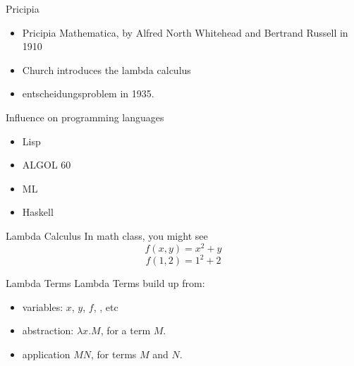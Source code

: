 \documentclass{beamer}
\begin{document}
\begin{frame}{Pricipia}
  \begin{itemize}
    \item Pricipia Mathematica, by Alfred North Whitehead and Bertrand Russell in 1910
    \item Church introduces the lambda calculus
    \item entscheidungsproblem in 1935.
  \end{itemize}
\end{frame}

\begin{frame}{Influence on programming languages}
  \begin{itemize}
    \item Lisp
    \item ALGOL 60
    \item ML
    \item Haskell
  \end{itemize}
\end{frame}

\begin{frame}{Lambda Calculus}
  In math class, you might see
  $$f(x, y) = x^2+y$$
  $$f(1, 2) = 1^2+2$$
\end{frame}

\begin{frame}{Lambda Terms}
  Lambda Terms build up from:
  \begin{itemize}
    \item variables: $x$, $y$, $f$, \Coffeecup, etc
    \item abstraction: $\lambda x. M$, for a term $M$.
    \item application $MN$, for terms $M$ and $N$.
  \end{itemize}
\end{frame}
\end{document}
